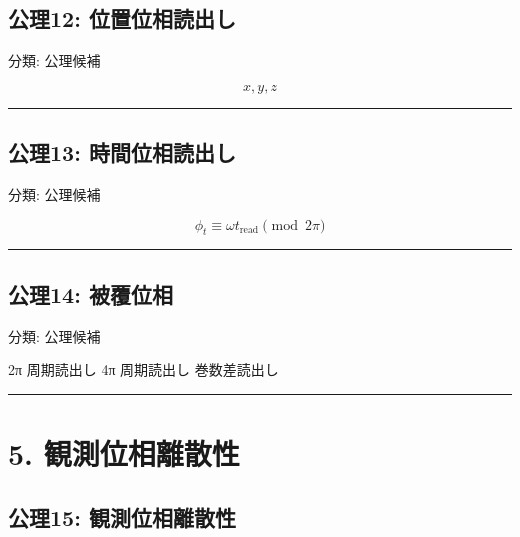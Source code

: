 \documentclass[
  a4paper,
]{ltjsarticle}
\newenvironment{Shaded}{}{}
\newcommand{\NormalTok}[1]{#1}
\begin{document}
\subsection{公理12:
位置位相読出し}\label{ux516cux740612-ux4f4dux7f6eux4f4dux76f8ux8aadux51faux3057}

分類: 公理候補

\[
x,y,z
\]

\begin{center}\rule{0.5\linewidth}{0.5pt}\end{center}

\subsection{公理13:
時間位相読出し}\label{ux516cux740613-ux6642ux9593ux4f4dux76f8ux8aadux51faux3057}

分類: 公理候補

\[
\phi_t\equiv\omega t_{\mathrm{read}}\pmod{2\pi}
\]

\begin{center}\rule{0.5\linewidth}{0.5pt}\end{center}

\subsection{公理14:
被覆位相}\label{ux516cux740614-ux88abux8986ux4f4dux76f8}

分類: 公理候補

\begin{Shaded}
\begin{Highlighting}[]
\NormalTok{2π 周期読出し}
\NormalTok{4π 周期読出し}
\NormalTok{巻数差読出し}
\end{Highlighting}
\end{Shaded}

\begin{center}\rule{0.5\linewidth}{0.5pt}\end{center}

\section{5.
観測位相離散性}\label{ux89b3ux6e2cux4f4dux76f8ux96e2ux6563ux6027}

\subsection{公理15:
観測位相離散性}\label{ux516cux740615-ux89b3ux6e2cux4f4dux76f8ux96e2ux6563ux6027}
\end{document}
